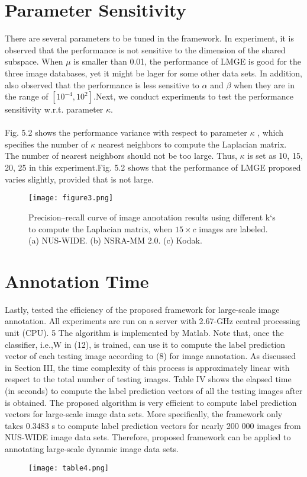 \documentclass[a4paper,11pt]{report}
\begin{document}
\section{Parameter Sensitivity}
There are several parameters to be tuned in the framework.
In  experiment, it is observed that the performance is not sensitive
to the dimension of the shared subspace. When $\mu$ is smaller than 0.01, the performance of LMGE is good for the three image
databases, yet it might be lager for some other data sets. In addition,
also observed that the performance is less sensitive to $\alpha$ and $\beta$
when they are in the range of $[10^{-4},10^2]$.Next, we conduct
experiments to test the performance sensitivity w.r.t. parameter $\kappa$.
\paragraph{}
Fig. 5.2 shows the performance variance with respect to parameter $\kappa$
, which specifies the number of $\kappa$ nearest neighbors to
compute the Laplacian matrix. The number of nearest neighbors
should not be too large. Thus, $\kappa$ is set as {10, 15, 20, 25}
in this experiment.Fig. 5.2 shows that the performance
of LMGE proposed  varies slightly, provided that
is not large. 
\begin{figure} [ht]
 \centering
\texttt{[image: figure3.png]}
\caption{Precision–recall curve of image annotation results using different k`s to compute the Laplacian matrix, when $15\times c$ images are labeled. (a) NUS-WIDE.
(b) NSRA-MM 2.0. (c) Kodak.}
\end{figure}
\section{Annotation Time}

Lastly,  tested the efficiency of the proposed framework
for large-scale image annotation. All experiments are run
on a server with 2.67-GHz central processing unit (CPU). 5
The algorithm is implemented by Matlab. Note that, once the
classifier, i.e.,W in (12), is trained,  can use it to compute
the label prediction vector of each testing image according to
(8) for image annotation. As  discussed in Section III, the
time complexity of this process is approximately linear with
respect to the total number of testing images. Table IV shows
the elapsed time (in seconds) to compute the label prediction
vectors of all the testing images after is obtained. The proposed algorithm is very efficient to compute label prediction
vectors for large-scale image data sets. More specifically, the
framework only takes 0.3483 s to compute label prediction
vectors for nearly 200 000 images from NUS-WIDE image
data sets. Therefore, proposed framework can
be applied to annotating large-scale dynamic image data sets.
\begin{figure} [ht]
 \centering
\texttt{[image: table4.png]}

\end{figure}
\end{document}
